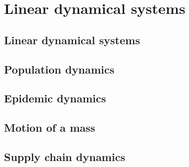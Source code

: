 \section{Linear dynamical systems}
\subsection{Linear dynamical systems}
\subsection{Population dynamics}
\subsection{Epidemic dynamics}
\subsection{Motion of a mass}
\subsection{Supply chain dynamics}